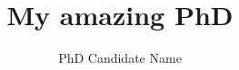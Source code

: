 \documentclass{yorkThesis}
\begin{document}
	\frontmatter
\title{My amazing PhD}
\author{PhD Candidate Name}
\titlePage


\begin{spacing}{0}
\tableofcontents
\listoffigures
\listoftables
\end{spacing}





\mainmatter











\begin{appendices}

\end{appendices}



\end{document}
